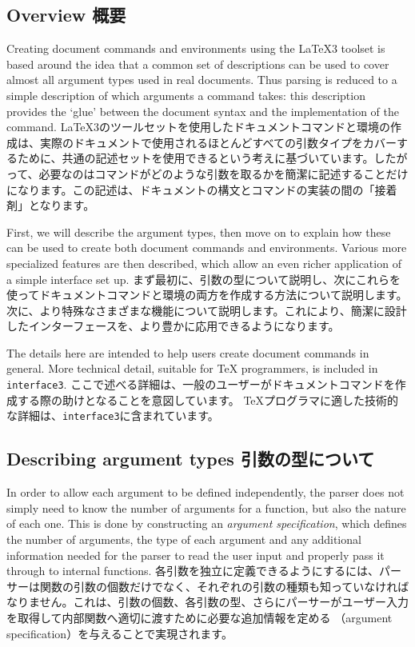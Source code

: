\documentclass{ltxguide}
\newcommand\jpnewline{\vspace{3pt}\newline}
\DeclareRobustCommand{\jpemph}[1]{%
  \underLine{#1}%
}
\begin{document}
\subsection{Overview
概要}

Creating document commands and environments using the \LaTeX3 toolset is based
around the idea that a common set of descriptions can be used to cover almost
all argument types used in real documents. Thus parsing is reduced to a simple
description of which arguments a command takes: this description provides the
`glue' between the document syntax and the implementation of the
command.
\jpnewline
\LaTeX3{}のツールセットを使用したドキュメントコマンドと環境の作成は、実際のドキュメントで使用されるほとんどすべての引数タイプをカバーするために、共通の記述セットを使用できるという考えに基づいています。したがって、必要なのはコマンドがどのような引数を取るかを簡潔に記述することだけになります。この記述は、ドキュメントの構文とコマンドの実装の間の「接着剤」となります。

First, we will describe the argument types, then move on to explain how these
can be used to create both document commands and environments. Various more
specialized features are then described, which allow an even richer application
of a simple interface set up.
\jpnewline
まず最初に、引数の型について説明し、次にこれらを使ってドキュメントコマンドと環境の両方を作成する方法について説明します。次に、より特殊なさまざまな機能について説明します。これにより、簡潔に設計したインターフェースを、より豊かに応用できるようになります。

The details here are intended to help users create document commands in
general. More technical detail, suitable for \TeX{} programmers, is included
in \texttt{interface3}.
\jpnewline
ここで述べる詳細は、一般のユーザーがドキュメントコマンドを作成する際の助けとなることを意図しています。 \TeX{}プログラマに適した技術的な詳細は、\texttt{interface3}に含まれています。

\subsection{Describing argument types
引数の型について}

In order to allow each argument to be defined independently, the parser does
not simply need to know the number of arguments for a function, but also the
nature of each one. This is done by constructing an \emph{argument
specification}, which defines the number of arguments, the type of each
argument and any additional information needed for the parser to read the user
input and properly pass it through to internal functions.
\jpnewline
各引数を独立に定義できるようにするには、パーサーは関数の引数の個数だけでなく、それぞれの引数の種類も知っていなければなりません。これは、引数の個数、各引数の型、さらにパーサーがユーザー入力を取得して内部関数へ適切に渡すために必要な追加情報を定める\jpemph{引数指定}（argument specification）を与えることで実現されます。
\end{document}
